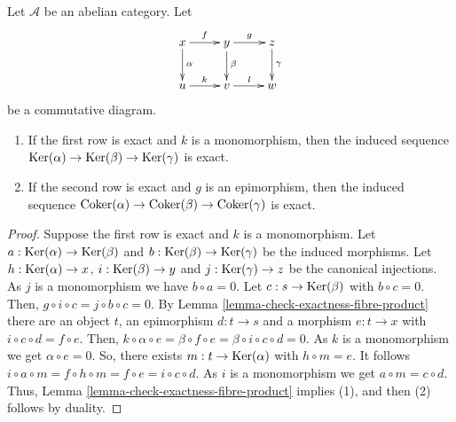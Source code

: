 \begin{lemma}
\label{lemma-exact-kernel-sequence}
Let $\mathcal{A}$ be an abelian category. Let
$$
\xymatrix{
x \ar[r]^f \ar[d]^\alpha &
y \ar[r]^g \ar[d]^\beta &
z \ar[d]^\gamma\\
u \ar[r]^k & v \ar[r]^l & w
}
$$
be a commutative diagram.
\begin{enumerate}
\item If the first row is exact and $k$ is a monomorphism, then the induced 
sequence $\mathop{\mathrm{Ker}}(\alpha) \to \mathop{\mathrm{Ker}}(\beta) \to \mathop{\mathrm{Ker}}(\gamma)$ 
is exact.
\item If the second row is exact and $g$ is an epimorphism, then the induced 
sequence
$\mathop{\mathrm{Coker}}(\alpha) \to \mathop{\mathrm{Coker}}(\beta) \to \mathop{\mathrm{Coker}}(\gamma)$ 
is exact.
\end{enumerate}
\end{lemma}

\begin{proof}
Suppose the first row is exact and $k$ is a monomorphism. Let 
$a:\mathop{\mathrm{Ker}}(\alpha)\to\mathop{\mathrm{Ker}}(\beta)$ and 
$b:\mathop{\mathrm{Ker}}(\beta)\to\mathop{\mathrm{Ker}}(\gamma)$ be the induced morphisms. 
Let $h:\mathop{\mathrm{Ker}}(\alpha)\to x$, $i:\mathop{\mathrm{Ker}}(\beta)\to y$ and 
$j:\mathop{\mathrm{Ker}}(\gamma)\to z$ be the canonical injections. As $j$ is 
a monomorphism we have $b\circ a=0$. Let $c:s\to\mathop{\mathrm{Ker}}(\beta)$ 
with $b\circ c=0$. Then, $g\circ i\circ c=j\circ b\circ c=0$. By 
Lemma \ref{lemma-check-exactness-fibre-product} there are an object $t$, an 
epimorphism $d:t\to s$ and a morphism $e:t\to x$ with 
$i\circ c\circ d=f\circ e$. Then, 
$k\circ \alpha\circ e=\beta\circ f\circ e=\beta\circ i\circ c\circ d=0$. 
As $k$ is a monomorphism we get $\alpha\circ e=0$. So, there exists 
$m:t\to\mathop{\mathrm{Ker}}(\alpha)$ with $h\circ m=e$. It follows 
$i\circ a\circ m=f\circ h\circ m=f\circ e=i\circ c\circ d$. 
As $i$ is a monomorphism we get $a\circ m=c\circ d$. Thus, 
Lemma \ref{lemma-check-exactness-fibre-product} implies (1), and then 
(2) follows by duality.
\end{proof}

